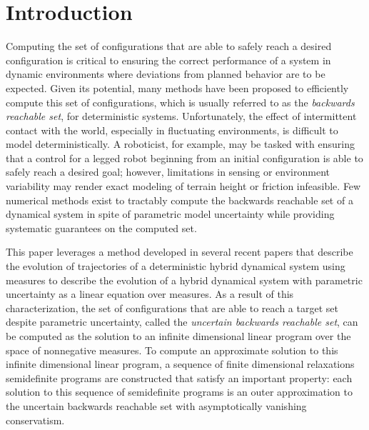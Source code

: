 \section{Introduction}
  
Computing the set of configurations that are able to safely reach a desired configuration is critical to ensuring the correct performance of a system in dynamic environments where deviations from planned behavior are to be expected.
Given its potential, many methods have been proposed to efficiently compute this set of configurations, which is usually referred to as the \emph{backwards reachable set}, for deterministic systems.
Unfortunately, the effect of intermittent contact with the world, especially in fluctuating environments, is difficult to model deterministically. 
A roboticist, for example, may be tasked with ensuring that a control for a legged robot beginning from an initial configuration is able to safely reach a desired goal; however, limitations in sensing or environment variability may render exact modeling of terrain height or friction infeasible.
Few numerical methods exist to tractably compute the backwards reachable set of a dynamical system in spite of parametric model uncertainty while providing systematic guarantees on the computed set. 

This paper leverages a method developed in several recent papers \cite{henrion2014convex,majumdar2014convex,shia2014convex} that describe the evolution of trajectories of a deterministic hybrid dynamical system using measures to describe the evolution of a hybrid dynamical system with parametric uncertainty as a linear equation over measures. 
As a result of this characterization, the set of configurations that are able to reach a target set despite parametric uncertainty, called the \emph{uncertain backwards reachable set}, can be computed as the solution to an infinite dimensional linear program over the space of nonnegative measures. 
To compute an approximate solution to this infinite dimensional linear program, a sequence of finite dimensional relaxations semidefinite programs are constructed that satisfy an important property:
each solution to this sequence of semidefinite programs is an outer approximation to the uncertain backwards reachable set with asymptotically vanishing conservatism.

